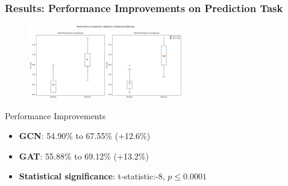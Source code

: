 \documentclass[10pt, aspectratio = 169]{beamer}
\begin{document}
\begin{frame}
    \frametitle{Results: Performance Improvements on Prediction Task}

    \begin{figure}
        \includegraphics[width=0.6\textwidth]{figures/performance_comparison_20250314_194357.png}
    \end{figure}

    \begin{block}{Performance Improvements}
        \begin{itemize}
            \item \textbf{GCN}: 54.90\% to 67.55\% (+12.6\%)
            \item \textbf{GAT}: 55.88\% to 69.12\% (+13.2\%)
            \item \textbf{Statistical significance}: t-statistic:-8, $p \le 0.0001$
        \end{itemize}    
    \end{block}
\end{frame}
\end{document}
